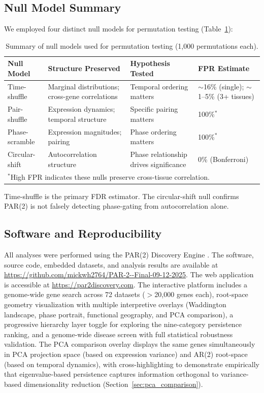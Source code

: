 \documentclass[11pt,letterpaper]{article}
\begin{document}
\subsection{Null Model Summary}

We employed four distinct null models for permutation testing (Table~\ref{tab:null_summary}):

\begin{table}[H]
\centering
\caption{Summary of null models used for permutation testing (1,000 permutations each).}
\label{tab:null_summary}
\begin{tabular}{p{2.5cm}p{3.5cm}p{4cm}p{2.5cm}}
\toprule
Null Model & Structure Preserved & Hypothesis Tested & FPR Estimate \\
\midrule
Time-shuffle & Marginal distributions; cross-gene correlations & Temporal ordering matters & $\sim$16\% (single); $\sim$1--5\% (3+ tissues) \\
Pair-shuffle & Expression dynamics; temporal structure & Specific pairing matters & 100\%$^*$ \\
Phase-scramble & Expression magnitudes; pairing & Phase ordering matters & 100\%$^*$ \\
Circular-shift & Autocorrelation structure & Phase relationship drives significance & 0\% (Bonferroni) \\
\bottomrule
\multicolumn{4}{l}{\small $^*$High FPR indicates these nulls preserve cross-tissue correlation.} \\
\end{tabular}
\end{table}

Time-shuffle is the primary FDR estimator. The circular-shift null confirms PAR(2) is not falsely detecting phase-gating from autocorrelation alone.

\subsection{Software and Reproducibility}

All analyses were performed using the PAR(2) Discovery Engine \citep{whiteside2026zenodo}. The software, source code, embedded datasets, and analysis results are available at \url{https://github.com/mickwh2764/PAR-2--Final-09-12-2025}. The web application is accessible at \url{https://par2discovery.com}. The interactive platform includes a genome-wide gene search across 72 datasets ($>$20,000 genes each), root-space geometry visualization with multiple interpretive overlays (Waddington landscape, phase portrait, functional geography, and PCA comparison), a progressive hierarchy layer toggle for exploring the nine-category persistence ranking, and a genome-wide disease screen with full statistical robustness validation. The PCA comparison overlay displays the same genes simultaneously in PCA projection space (based on expression variance) and AR(2) root-space (based on temporal dynamics), with cross-highlighting to demonstrate empirically that eigenvalue-based persistence captures information orthogonal to variance-based dimensionality reduction (Section~\ref{sec:pca_comparison}).
\end{document}
